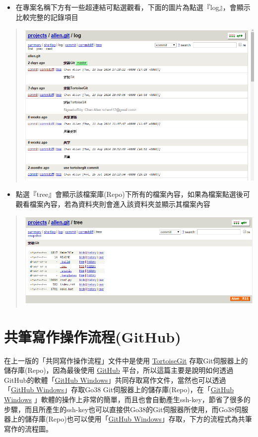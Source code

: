 \documentclass[letterpaper,10pt,english]{sphinxmanual}
\begin{document}
\begin{itemize}
\item {} 
在專案名稱下方有一些超連結可點選觀看，下面的圖片為點選『log』，會顯示比較完整的記錄項目

\end{itemize}
\begin{quote}

\includegraphics{gitweb-005.png}
\end{quote}
\begin{itemize}
\item {} 
點選『tree』會顯示該檔案庫(Repo)下所有的檔案內容，如果為檔案點選後可觀看檔案內容，若為資料夾則會進入該資料夾並顯示其檔案內容

\end{itemize}
\begin{quote}

\includegraphics{gitweb-006.png}
\end{quote}


\chapter{共筆寫作操作流程(GitHub)}
\label{_doc/writing/index-github::doc}\label{_doc/writing/index-github:github}
在上一版的「共同寫作操作流程」文件中是使用 \href{https://code.google.com/p/tortoisegit/}{TortoiseGit} 存取Git伺服器上的儲存庫(Repo)，因為最後使用 \href{https://github.com/}{GitHub} 平台，所以這篇主要是說明如何透過GitHub的軟體「\href{https://windows.github.com/}{GitHub Windows}」共同存取寫作文件，當然也可以透過「\href{https://windows.github.com/}{GitHub Windows}」存取Go38 Git伺服器上的儲存庫(Repo)，在「\href{https://windows.github.com/}{GitHub Windows} 」軟體的操作上非常的簡單，而且也會自動產生ssh-key，節省了很多的步驟，而且所產生的ssh-key也可以直接供Go38的Git伺服器所使用，而Go38伺服器上的儲存庫(Repo)也可以使用「\href{https://windows.github.com/}{GitHub Windows}」存取，下方的流程式為共筆寫作的流程圖。
\end{document}
